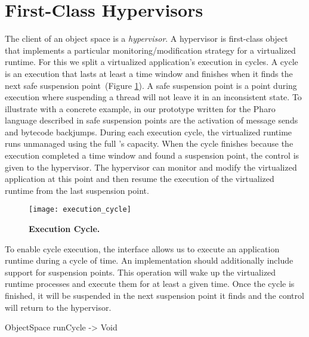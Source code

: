 
\section{First-Class Hypervisors}\label{sec:hypervisor}

The client of an object space is a \emph{hypervisor}. A hypervisor is first-class object that implements a particular monitoring/modification strategy for a virtualized runtime. For this we split a virtualized application's execution in cycles. A cycle is an execution that lasts at least a time window and finishes when it finds the next safe suspension point~(Figure \ref{fig:execution_cycle}). A safe suspension point is a point during execution where suspending a thread will not leave it in an inconsistent state. To illustrate with a concrete example, in our \Vtt prototype written for the Pharo language described in  safe suspension points are the activation of message sends and bytecode backjumps. During each execution cycle, the virtualized runtime runs unmanaged using the full \VM's capacity. When the cycle finishes because the execution completed a time window and found a suspension point, the control is given to the hypervisor. The hypervisor can monitor and modify the virtualized application at this point and then resume the execution of the virtualized runtime from the last suspension point.

\begin{figure}[ht]
\center
\texttt{[image: execution\_cycle]}
\caption{\textbf{Execution Cycle.} \label{fig:execution_cycle}}
\end{figure}

To enable cycle execution, the  interface allows us to execute an application runtime during a cycle of time. An \Vtt implementation should additionally include support for suspension points. This operation will wake up the virtualized runtime processes and execute them for at least a given time. Once the cycle is finished, it will be suspended in the next suspension point it finds and the control will return to the hypervisor.

\begin{code}
ObjectSpace {
    runCycle -> Void
}
\end{code}


